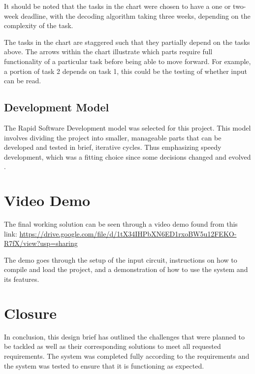 \documentclass{cce2014-design}
\begin{document}
It should be noted that the tasks in the chart were chosen to have a one or two-week deadline, with the decoding algorithm taking three weeks, depending on the complexity of the task.

The tasks in the chart are staggered such that they partially depend on the tasks above.
The arrows within the chart illustrate which parts require full functionality of a particular task before being able to move forward.
For example, a portion of task 2 depends on task 1, this could be the testing of whether input can be read.

\subsection{Development Model}

The Rapid Software Development model was selected for this project.
This model involves dividing the project into smaller, manageable parts that can be developed and tested in brief, iterative cycles.
Thus emphasizing speedy development, which was a fitting choice since some decisions changed and evolved \cite{RapidDev}.

\section{Video Demo}

The final working solution can be seen through a video demo found from this link: \url{https://drive.google.com/file/d/1tX34IHPbXN6ED1rxoBW5u12FEKO-R7fX/view?usp=sharing}

The demo goes through the setup of the input circuit, instructions on how to compile and load the project, and a demonstration of how to use the system and its features.

\section{Closure}

In conclusion, this design brief has outlined the challenges that were planned to be tackled as well as their corresponding solutions to meet all requested requirements.
The system was completed fully according to the requirements and the system was tested to ensure that it is functioning as expected.



\end{document}
